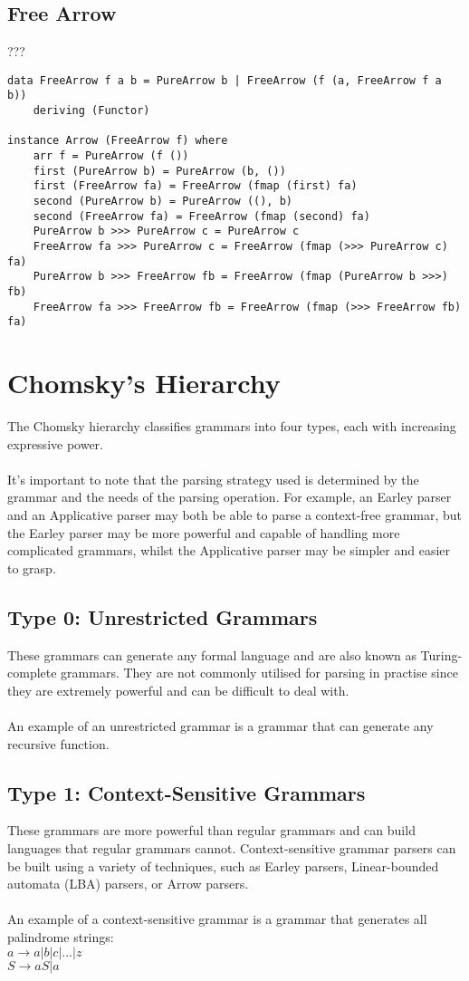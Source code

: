 \documentclass[12pt,twoside]{report}
\begin{document}
\subsection{Free Arrow}
???
\begin{verbatim}
data FreeArrow f a b = PureArrow b | FreeArrow (f (a, FreeArrow f a b))
    deriving (Functor)

instance Arrow (FreeArrow f) where
    arr f = PureArrow (f ())
    first (PureArrow b) = PureArrow (b, ())
    first (FreeArrow fa) = FreeArrow (fmap (first) fa)
    second (PureArrow b) = PureArrow ((), b)
    second (FreeArrow fa) = FreeArrow (fmap (second) fa)
    PureArrow b >>> PureArrow c = PureArrow c
    FreeArrow fa >>> PureArrow c = FreeArrow (fmap (>>> PureArrow c) fa)
    PureArrow b >>> FreeArrow fb = FreeArrow (fmap (PureArrow b >>>) fb)
    FreeArrow fa >>> FreeArrow fb = FreeArrow (fmap (>>> FreeArrow fb) fa)
\end{verbatim}
\section{Chomsky's Hierarchy}
The Chomsky hierarchy classifies grammars into four types, each with increasing expressive power. \\\\
It's important to note that the parsing strategy used is determined by the grammar and the needs of the parsing operation. For example, an Earley parser and an Applicative parser may both be able to parse a context-free grammar, but the Earley parser may be more powerful and capable of handling more complicated grammars, whilst the Applicative parser may be simpler and easier to grasp.
\subsection{Type 0: Unrestricted Grammars}
These grammars can generate any formal language and are also known as Turing-complete grammars. They are not commonly utilised for parsing in practise since they are extremely powerful and can be difficult to deal with. 
\\\\
An example of an unrestricted grammar is a grammar that can generate any recursive function.
\subsection{Type 1: Context-Sensitive Grammars}
These grammars are more powerful than regular grammars and can build languages that regular grammars cannot. Context-sensitive grammar parsers can be built using a variety of techniques, such as Earley parsers, Linear-bounded automata (LBA) parsers, or Arrow parsers.
\\\\
An example of a context-sensitive grammar is a grammar that generates all palindrome strings:\\
$a \rightarrow a | b | c | ... | z$\\
$S \rightarrow aS | a$
\end{document}
